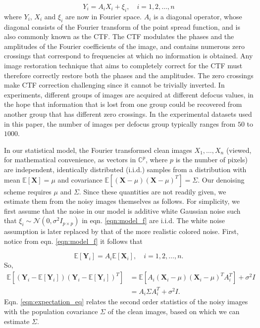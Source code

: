 \documentclass[review]{elsarticle}
\begin{document}
\begin{equation}
 Y_i = A_i X_i + \xi_i, \quad i=1,2,\ldots,n
\label{eqn:model_f}
\end{equation}
where $Y_i$, $X_i$ and $\xi_i$ are now in Fourier space. $A_i$ is 
a diagonal operator, whose diagonal consists of
the Fourier transform of the point spread function,
and is also commonly known as the CTF. The CTF modulates the
phases and the amplitudes of the Fourier coefficients of the image, and contains
numerous zero crossings that correspond
to frequencies at which no information is obtained.
Any image restoration technique that aims to completely correct for the CTF
must therefore correctly restore both the phases and the amplitudes.
The zero crossings make CTF correction
challenging since it cannot be trivially inverted. 
In experiments, different
groups of images are acquired at different defocus values, in the hope that 
information that is lost from one group could be
recovered from another group that has different zero crossings. In the experimental
datasets used in this paper, the number of images per defocus group typically ranges from 
$50$ to $1000$.

In our statistical model, the Fourier transformed clean images $X_1,\dots,X_n$ 
(viewed, for mathematical convenience, as vectors in $\mathbb{C}^p$, where $p$ is the number of pixels) 
are independent,
identically distributed (i.i.d.) samples from a distribution with mean $\mathbb{E}[\textbf{X}]=\mu$
and covariance $\mathbb{E}[(\textbf{X}-\mu)(\textbf{X}-\mu)^T]=\Sigma$. Our denoising scheme requires $\mu$ and
$\Sigma$. Since these quantities are not readily given, we estimate them from the noisy images themselves as follows.
For simplicity, we first assume that the noise in our model is additive 
white
Gaussian noise such that $\xi_i \sim \mathcal{N} (0,\sigma^2 I_{p \times p})$ 
in eqn. \ref{eqn:model_f} are i.i.d. The white noise assumption is later replaced by that 
of the more realistic colored noise. First, notice from eqn. \ref{eqn:model_f} it follows that

\begin{equation}
\mathbb{E}[\textbf{Y}_i]=A_i \mathbb{E}[\textbf{X}_i], \quad i=1,2,\ldots,n.
\label{eqn:exp_y}
\end{equation}
So,
\begin{equation}
\begin{aligned}
\mathbb{E}[(\textbf{Y}_i-\mathbb{E}[\textbf{Y}_i])(\textbf{Y}_i-\mathbb{E}[\textbf{Y}_i])^T] 
&= \mathbb{E} [A_i(\textbf{X}_i-\mu)(\textbf{X}_i-\mu)^T A_i^T] + \sigma^2I \\
&=  A_i \Sigma A_i^T + \sigma^2I .
\end{aligned}
\label{eqn:expectation_eq}
\end{equation}
Eqn. \ref{eqn:expectation_eq} relates the second order statistics of the noisy images with the 
population covariance $\Sigma$ of the clean images, based on which we can 
estimate $\Sigma$.
\end{document}
